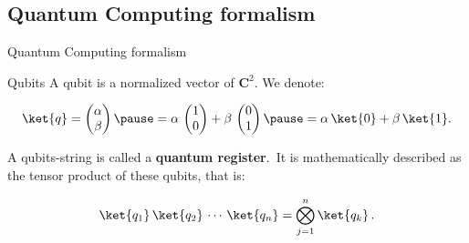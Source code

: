 \documentclass{beamer}
\begin{document}
\subsection{Quantum Computing formalism}

\begin{frame}{Quantum Computing formalism}
    \begin{block}{Qubits}
        A qubit  is a normalized vector of $\mathbf{C}^2$. We denote:
        
        \[\ket{q}=\begin{pmatrix}\alpha\\\beta\end{pmatrix}\pause=\alpha\,\begin{pmatrix}1\\0\end{pmatrix} + \beta\,\begin{pmatrix}0\\1\end{pmatrix}\pause=\alpha\,\ket{0}+\beta\,\ket{1}.\]
        
        \pause A qubits-string is called a \textbf{quantum register}.\pause\ It is mathematically described as the tensor product of these qubits, that is:
        
        \[\ket{q_1}\,\ket{q_2}\,\cdots\,\ket{q_n}=\bigotimes_{j=1}^n\ket{q_k}\,.\]
    \end{block}
\end{frame}
\end{document}

